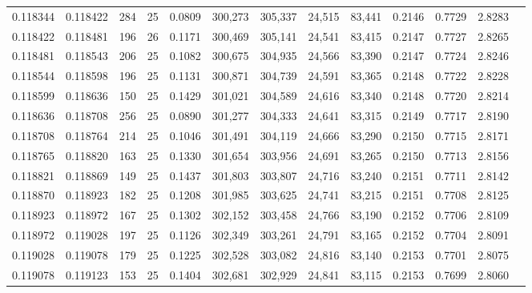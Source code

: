 \begin{tabular}{rrrrrrrrrrrrr}
0.118344 & 0.118422 &   284 &  25 &                                     0.0809 & 300,273 & 305,337 &  24,515 &  83,441 & 0.2146 & 0.7729 & 2.8283 \\
0.118422 & 0.118481 &   196 &  26 &                                     0.1171 & 300,469 & 305,141 &  24,541 &  83,415 & 0.2147 & 0.7727 & 2.8265 \\
0.118481 & 0.118543 &   206 &  25 &                                     0.1082 & 300,675 & 304,935 &  24,566 &  83,390 & 0.2147 & 0.7724 & 2.8246 \\
0.118544 & 0.118598 &   196 &  25 &                                     0.1131 & 300,871 & 304,739 &  24,591 &  83,365 & 0.2148 & 0.7722 & 2.8228 \\
0.118599 & 0.118636 &   150 &  25 &                                     0.1429 & 301,021 & 304,589 &  24,616 &  83,340 & 0.2148 & 0.7720 & 2.8214 \\
0.118636 & 0.118708 &   256 &  25 &                                     0.0890 & 301,277 & 304,333 &  24,641 &  83,315 & 0.2149 & 0.7717 & 2.8190 \\
0.118708 & 0.118764 &   214 &  25 &                                     0.1046 & 301,491 & 304,119 &  24,666 &  83,290 & 0.2150 & 0.7715 & 2.8171 \\
0.118765 & 0.118820 &   163 &  25 &                                     0.1330 & 301,654 & 303,956 &  24,691 &  83,265 & 0.2150 & 0.7713 & 2.8156 \\
0.118821 & 0.118869 &   149 &  25 &                                     0.1437 & 301,803 & 303,807 &  24,716 &  83,240 & 0.2151 & 0.7711 & 2.8142 \\
0.118870 & 0.118923 &   182 &  25 &                                     0.1208 & 301,985 & 303,625 &  24,741 &  83,215 & 0.2151 & 0.7708 & 2.8125 \\
0.118923 & 0.118972 &   167 &  25 &                                     0.1302 & 302,152 & 303,458 &  24,766 &  83,190 & 0.2152 & 0.7706 & 2.8109 \\
0.118972 & 0.119028 &   197 &  25 &                                     0.1126 & 302,349 & 303,261 &  24,791 &  83,165 & 0.2152 & 0.7704 & 2.8091 \\
0.119028 & 0.119078 &   179 &  25 &                                     0.1225 & 302,528 & 303,082 &  24,816 &  83,140 & 0.2153 & 0.7701 & 2.8075 \\
0.119078 & 0.119123 &   153 &  25 &                                     0.1404 & 302,681 & 302,929 &  24,841 &  83,115 & 0.2153 & 0.7699 & 2.8060 \\

\end{tabular}
